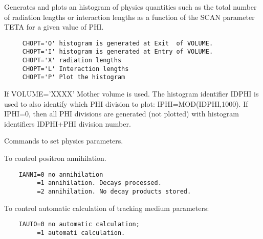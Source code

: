 \ENDCMD


\BEGARG
{}
\ENDARG
{}
\DEFOPT{\EMPTY}{}
\ENDOPT

   \par
Generates and plots an histogram of physics quantities such as the total 
   number of radiation lengths or interaction lengths as a function of the 
   SCAN parameter TETA for a given value of PHI.  
\begin{verbatim}
     CHOPT='O' histogram is generated at Exit  of VOLUME.
     CHOPT='I' histogram is generated at Entry of VOLUME.
     CHOPT='X' radiation lengths
     CHOPT='L' Interaction lengths
     CHOPT='P' Plot the histogram
\end{verbatim}
   \par
If VOLUME='XXXX' Mother volume is used.  The histogram identifier IDPHI is 
   used to also identify which PHI division to plot: IPHI=MOD(IDPHI,1000).  If 
   IPHI=0, then all PHI divisions are generated (not plotted) with histogram 
   identifiers IDPHI+PHI division number.  

\ENDCMD
\newpage
{}
\ifMENUtext
   \par
Commands to set physics parameters.  


\fi


\BEGARG
{}
\ENDARG
{}
\ENDOPT

   \par
To control positron annihilation.  
\begin{verbatim}
    IANNI=0 no annihilation
         =1 annihilation. Decays processed.
         =2 annihilation. No decay products stored.
\end{verbatim}

\ENDCMD


\BEGARG
{}
\ENDARG
{}
\ENDOPT

   \par
To control automatic calculation of tracking medium parameters:  
\begin{verbatim}
    IAUTO=0 no automatic calculation;
         =1 automati calculation.
\end{verbatim}

